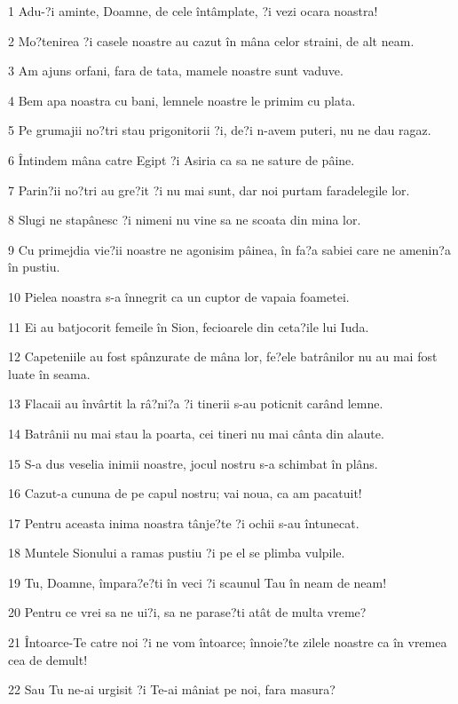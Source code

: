 \par 1 Adu-?i aminte, Doamne, de cele întâmplate, ?i vezi ocara noastra!
\par 2 Mo?tenirea ?i casele noastre au cazut în mâna celor straini, de alt neam.
\par 3 Am ajuns orfani, fara de tata, mamele noastre sunt vaduve.
\par 4 Bem apa noastra cu bani, lemnele noastre le primim cu plata.
\par 5 Pe grumajii no?tri stau prigonitorii ?i, de?i n-avem puteri, nu ne dau ragaz.
\par 6 Întindem mâna catre Egipt ?i Asiria ca sa ne sature de pâine.
\par 7 Parin?ii no?tri au gre?it ?i nu mai sunt, dar noi purtam faradelegile lor.
\par 8 Slugi ne stapânesc ?i nimeni nu vine sa ne scoata din mina lor.
\par 9 Cu primejdia vie?ii noastre ne agonisim pâinea, în fa?a sabiei care ne amenin?a în pustiu.
\par 10 Pielea noastra s-a înnegrit ca un cuptor de vapaia foametei.
\par 11 Ei au batjocorit femeile în Sion, fecioarele din ceta?ile lui Iuda.
\par 12 Capeteniile au fost spânzurate de mâna lor, fe?ele batrânilor nu au mai fost luate în seama.
\par 13 Flacaii au învârtit la râ?ni?a ?i tinerii s-au poticnit carând lemne.
\par 14 Batrânii nu mai stau la poarta, cei tineri nu mai cânta din alaute.
\par 15 S-a dus veselia inimii noastre, jocul nostru s-a schimbat în plâns.
\par 16 Cazut-a cununa de pe capul nostru; vai noua, ca am pacatuit!
\par 17 Pentru aceasta inima noastra tânje?te ?i ochii s-au întunecat.
\par 18 Muntele Sionului a ramas pustiu ?i pe el se plimba vulpile.
\par 19 Tu, Doamne, împara?e?ti în veci ?i scaunul Tau în neam de neam!
\par 20 Pentru ce vrei sa ne ui?i, sa ne parase?ti atât de multa vreme?
\par 21 Întoarce-Te catre noi ?i ne vom întoarce; înnoie?te zilele noastre ca în vremea cea de demult!
\par 22 Sau Tu ne-ai urgisit ?i Te-ai mâniat pe noi, fara masura?


